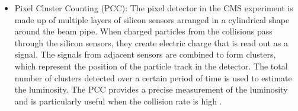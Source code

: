 \begin{itemize}

\item Pixel Cluster Counting (PCC): The pixel detector in the CMS experiment is made up of multiple layers of silicon sensors arranged in a cylindrical shape around the beam pipe. When charged particles from the collisions pass through the silicon sensors, they create electric charge that is read out as a signal. The signals from adjacent sensors are combined to form clusters, which represent the position of the particle track in the detector. The total number of clusters detected over a certain period of time is used to estimate the luminosity. The PCC provides a precise measurement of the luminosity and is particularly useful when the collision rate is high \cite{CMS-PAS-LUM-13-001}.

\end{itemize}


